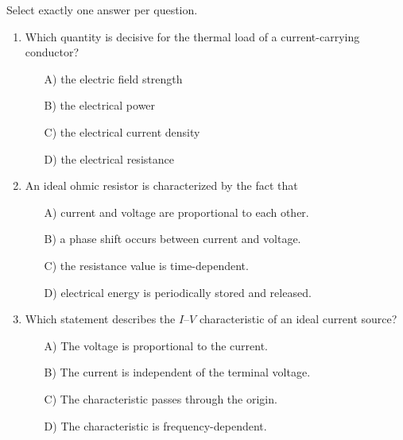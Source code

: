 \documentclass[a4paper,12pt]{article}
\newif\ifshowsolutions
\begin{document}
Select exactly one answer per question.

\vspace{8pt}

\begin{enumerate}[label=\textbf{\arabic*.}, leftmargin=*, itemsep=8pt]

  \item Which quantity is decisive for the thermal load of a current-carrying conductor?
    \begin{itemize}[label=$\square$]
      \item[A)] the electric field strength
      \item[B)] the electrical power
      \item[C)] the electrical current density
      \item[D)] the electrical resistance
    \end{itemize}

\ifshowsolutions
Solution: C
\fi

  \item An ideal ohmic resistor is characterized by the fact that
    \begin{itemize}[label=$\square$]
      \item[A)] current and voltage are proportional to each other.
      \item[B)] a phase shift occurs between current and voltage.
      \item[C)] the resistance value is time-dependent.
      \item[D)] electrical energy is periodically stored and released.
    \end{itemize}

\ifshowsolutions
Solution: A
\fi

  \item Which statement describes the $I$–$V$ characteristic of an ideal current source?
    \begin{itemize}[label=$\square$]
      \item[A)] The voltage is proportional to the current.
      \item[B)] The current is independent of the terminal voltage.
      \item[C)] The characteristic passes through the origin.
      \item[D)] The characteristic is frequency-dependent.
    \end{itemize}

\ifshowsolutions
Solution: B
\fi


\end{enumerate}
\end{document}
